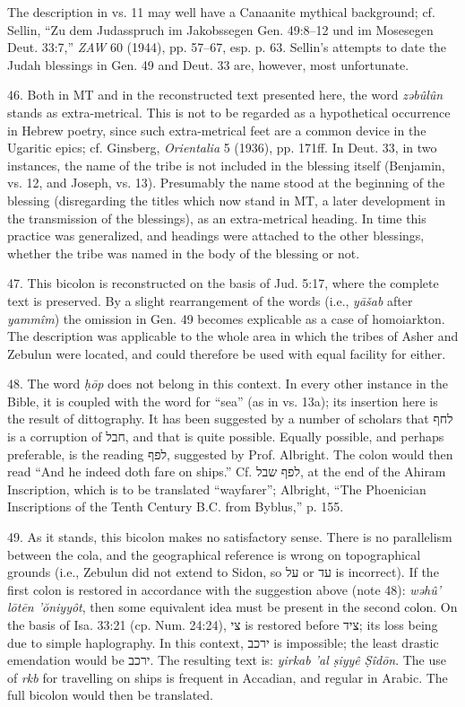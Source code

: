 \begin{enumerate}
The description in vs. 11 may well have a Canaanite mythical background; cf.
Sellin, ``Zu dem Judasspruch im Jakobssegen Gen. 49:8--12 und im Mosesegen
Deut. 33:7,'' \emph{ZAW} 60 (1944), pp. 57--67, esp. p. 63. Sellin's attempts
to date the Judah blessings in Gen. 49 and Deut. 33 are, however, most
unfortunate.

46. Both in MT and in the reconstructed text presented here, the word
\emph{zəbûlûn} stands as extra-metrical. This is not to be regarded as a
hypothetical occurrence in Hebrew poetry, since such extra-metrical feet are a
common device in the Ugaritic epics; cf. Ginsberg, \emph{Orientalia} 5 (1936),
pp. 171ff. In Deut. 33, in two instances, the name of the tribe is not included
in the blessing itself (Benjamin, vs. 12, and Joseph, vs. 13). Presumably the
name stood at the beginning of the blessing (disregarding the titles which now
stand in MT, a later development in the transmission of the blessings), as an
extra-metrical heading. In time this practice was generalized, and headings
were attached to the other blessings, whether the tribe was named in the body
of the blessing or not.

47. This bicolon is reconstructed on the basis of Jud. 5:17, where the complete
text is preserved. By a slight rearrangement of the words (i.e., \emph{yāšab}
after \emph{yammîm}) the omission in Gen. 49 becomes explicable as a case of
homoiarkton. The description was applicable to the whole area in which the
tribes of Asher and Zebulun were located, and could therefore be used with
equal facility for either.

48. The word \emph{ḥōp} does not belong in this context. In every other
instance in the Bible, it is coupled with the word for ``sea'' (as in vs.
13a); its insertion here is the result of dittography. It has been suggested
by a number of scholars that לחף is a corruption of חבל, and that is quite
possible. Equally possible, and perhaps preferable, is the reading לפף,
suggested by Prof. Albright. The colon would then read ``And he indeed doth
fare on ships.'' Cf. לפף שבל, at the end of the Ahiram Inscription, which is
to be translated ``wayfarer''; Albright, ``The Phoenician Inscriptions of the
Tenth Century B.C. from Byblus,'' p. 155.

49. As it stands, this bicolon makes no satisfactory sense. There is no
parallelism between the cola, and the geographical reference is wrong on
topographical grounds (i.e., Zebulun did not extend to Sidon, so על or עד is
incorrect). If the first colon is restored in accordance with the suggestion
above (note 48): \emph{wəhû' lōtēn 'ŏniyyôt}, then some equivalent idea must
be present in the second colon. On the basis of Isa. 33:21 (cp. Num. 24:24),
צי is restored before ציד; its loss being due to simple haplography. In this
context, ירכב is impossible; the least drastic emendation would be ירכב. The
resulting text is: \emph{yirkab 'al ṣiyyê Ṣîdōn}. The use of \emph{rkb} for
travelling on ships is frequent in Accadian, and regular in Arabic. The full
bicolon would then be translated.


\end{enumerate}
